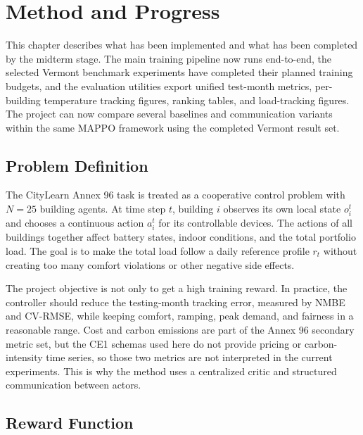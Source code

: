 ﻿\chapter{Method and Progress}\label{ch:method}

This chapter describes what has been implemented and what has been completed by
the midterm stage. The main training pipeline now runs end-to-end, the selected
Vermont benchmark experiments have completed their planned training budgets, and
the evaluation utilities export unified test-month metrics, per-building
temperature tracking figures, ranking tables, and load-tracking figures. The
project can now compare several baselines and communication variants within the
same MAPPO framework using the completed Vermont result set.

\section{Problem Definition}

The CityLearn Annex 96 task is treated as a cooperative control problem with
$N=25$ building agents. At time step $t$, building $i$ observes its own local
state $o_i^t$ and chooses a continuous action $a_i^t$ for its controllable
devices. The actions of all buildings together affect battery states, indoor
conditions, and the total portfolio load. The goal is to make the total load
follow a daily reference profile $r_t$ without creating too many comfort
violations or other negative side effects.

The project objective is not only to get a high training reward. In practice,
the controller should reduce the testing-month tracking error, measured by NMBE
and CV-RMSE, while keeping comfort, ramping, peak demand, and fairness in a
reasonable range. Cost and carbon emissions are part of the Annex 96 secondary
metric set, but the CE1 schemas used here do not provide pricing or
carbon-intensity time series, so those two metrics are not interpreted in the
current experiments. This is why the method uses a centralized critic and
structured communication between actors.

\section{Reward Function}

